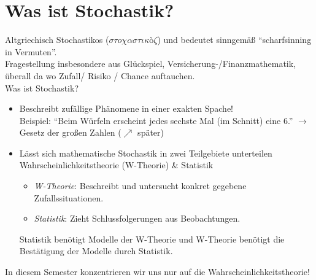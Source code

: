 \chapter*{Was ist Stochastik?}

Altgriechisch Stochastikos ($\sigma \tau o \chi \alpha \sigma \tau \iota \kappa$\`{o}$ \zeta$) und bedeutet sinngemäß ``scharfsinning in Vermuten''.\\
Fragestellung insbesondere aus Glückspiel, Versicherung-/Finanzmathematik, überall da wo Zufall/ Risiko / Chance auftauchen.\\
Was ist Stochastik?
\begin{itemize}
	\item Beschreibt zufällige Phänomene in einer exakten Spache!\\
	Beispiel: ``Beim Würfeln erscheint jedes sechste Mal (im Schnitt) eine 6.'' $\longrightarrow$ Gesetz der großen Zahlen ($\nearrow$ später) %
	\item Lässt sich mathematische Stochastik in zwei Teilgebiete unterteilen\\
	Wahrscheinlichkeitstheorie (W-Theorie) \& Statistik
	\begin{itemize}
		\item \textit{W-Theorie}: Beschreibt und untersucht konkret gegebene Zufallssituationen.
		\item \textit{Statistik}: Zieht Schlussfolgerungen aus Beobachtungen.
	\end{itemize}
	Statistik benötigt Modelle der W-Theorie und W-Theorie benötigt die Bestätigung der Modelle durch Statistik.
\end{itemize}
In diesem Semester konzentrieren wir uns nur auf die Wahrscheinlichkeitstheorie!